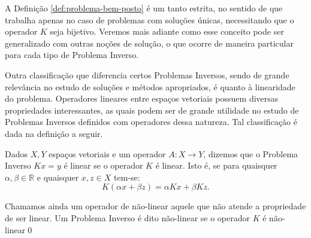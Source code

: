 A Definição \ref{def:problema-bem-posto} é um tanto estrita, no sentido de que trabalha apenas no caso de problemas com soluções únicas, necessitando que o operador $K$ seja bijetivo. Veremos mais adiante como esse conceito pode ser generalizado com outras noções de solução, o que ocorre de maneira particular para cada tipo de Problema Inverso.

Outra classificação que diferencia certos Problemas Inversos, sendo de grande relevância no estudo de soluções e métodos apropriados, é quanto à linearidade do problema. Operadores lineares entre espaços vetoriais possuem diversas propriedades interessantes, as quais podem ser de grande utilidade no estudo de Problemas Inversos definidos com operadores dessa natureza. Tal classificação é dada na definição a seguir.

\begin{defin}
Dados $X, Y$ espaços vetoriais e um operador $A: X \to Y$, dizemos que o Problema Inverso $Kx = y$ é linear se o operador $K$ é linear. Isto é, se para quaisquer $\alpha, \beta \in \mathbb R$ e quaisquer $x,z \in X$ tem-se:
\begin{equation*}
    K(\alpha x + \beta z) = \alpha Kx + \beta Kz.
\end{equation*}  

Chamamos ainda um operador de não-linear aquele que não atende a propriedade de ser linear. Um Problema Inverso é dito não-linear se o operador $K$ é não-linear\qed
\end{defin}